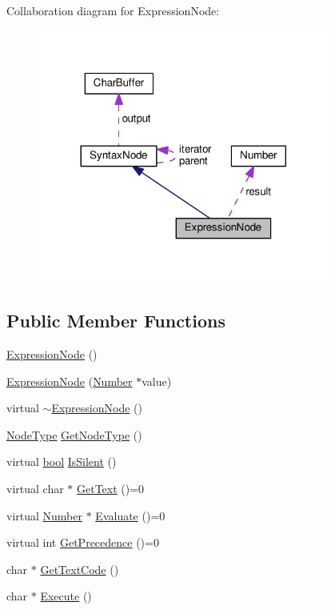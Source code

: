 Collaboration diagram for Expression\+Node\+:\nopagebreak
\begin{figure}[H]
\begin{center}
\leavevmode
\includegraphics[width=272pt]{classExpressionNode__coll__graph}
\end{center}
\end{figure}
\subsection*{Public Member Functions}
\begin{DoxyCompactItemize}
\item 
\hyperlink{classExpressionNode_adc8888de5329d356224c8a93f3ce2b75}{Expression\+Node} ()
\item 
\hyperlink{classExpressionNode_a5d67579dd6c9777a18455a1360f29841}{Expression\+Node} (\hyperlink{structNumber}{Number} $\ast$value)
\item 
virtual \hyperlink{classExpressionNode_aa834d6d0e96a958d22609dad612b54b0}{$\sim$\+Expression\+Node} ()
\item 
\hyperlink{nodes_8h_acac9cbaeea226ed297804c012dc12b16}{Node\+Type} \hyperlink{classExpressionNode_aaa0ecd3971c182bbc605623b83afc519}{Get\+Node\+Type} ()
\item 
virtual \hyperlink{platform_8h_a1062901a7428fdd9c7f180f5e01ea056}{bool} \hyperlink{classExpressionNode_adc58a4c102b7fa18e9c3a0be361b0663}{Is\+Silent} ()
\item 
virtual char $\ast$ \hyperlink{classExpressionNode_a0bbf243108a14eaf963a8161ffd8eb92}{Get\+Text} ()=0
\item 
virtual \hyperlink{structNumber}{Number} $\ast$ \hyperlink{classExpressionNode_a64975d4dc37742228bd522f6204537f7}{Evaluate} ()=0
\item 
virtual int \hyperlink{classExpressionNode_a161b9ea0b79bbfc101d6f687c8481ddd}{Get\+Precedence} ()=0
\item 
char $\ast$ \hyperlink{classExpressionNode_abb495de256b8c9a1c7bb61910fab25ab}{Get\+Text\+Code} ()
\item 
char $\ast$ \hyperlink{classExpressionNode_a923ac9b73f5568dd6bc65620d549c4ce}{Execute} ()
\end{DoxyCompactItemize}
